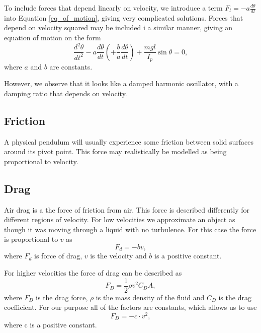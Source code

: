 \documentclass[11pt, a4paper]{article}
\begin{document}
To include forces that depend linearly on velocity, we introduce a term
$F_l = -a \frac{d\theta}{dt}$ into Equation \ref{eq_of_motion}, giving
very complicated solutions. Forces that depend on velocity squared may be included
i a similar manner, giving an equation of motion on the form
\begin{equation}
    \frac{d^2\theta}{dt^2} 
  - a \frac{d\theta}{dt} \left(
  + \frac{b}{a} \frac{d\theta}{dt} \right)  
  + \frac{mgl}{I_p}\sin{\theta} = 0,
  \label{eq_of_motion_complicated}
\end{equation}
where $a$ and $b$ are constants.

However, we observe that it looks like a damped harmonic oscillator\cite{osc}, with a
damping ratio that depends on velocity.


\subsection{Friction}
A physical pendulum will usually experience some friction between solid
surfaces around its pivot point.
This force may realistically be modelled as being proportional to velocity\cite{}.


\subsection{Drag}
Air drag is a the force of friction from air. This force is described differently for different regions of velocity. 
For low velocities we approximate an object as though it was moving through a liquid with no turbulence.
For this case the force is proportional to $v$ as
\[
F_d = -bv,
\]
where $F_d$ is force of drag, $v$ is the velocity and $b$ is a positive constant. 

For higher velocities the force of drag can be described as
\[
 F_D = \frac{1}{2}\rho v^2 C_D A,
\]
where $F_D$ is the drag force, $\rho$ is the mass density of the fluid and $C_D$ is the drag coefficient.
For our purpose all of the factors are constants, which allows us to use
\[
 F_D = -c\cdot v^2,
\]
where c is a positive constant.
\end{document}

